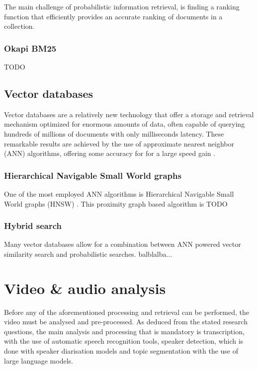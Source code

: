 \documentclass[twoside]{uva-inf-bachelor-thesis}
\begin{document}
 \cite{robertson1977probability}

The main challenge of probabilistic information retrieval, is finding a ranking function that efficiently provides an accurate ranking of documents in a collection. 

\subsubsection{Okapi BM25}
TODO


\subsection{Vector databases}
Vector databases are a relatively new technology that offer a storage and retrieval mechanism optimized for enormous amounts of data, often capable of querying hundreds of millions of documents with only milliseconds latency. 
These remarkable results are achieved by the use of approximate nearest neighbor (ANN) algorithms, offering some accuracy for for a large speed gain \cite{han2023comprehensive}. 

\subsubsection{Hierarchical Navigable Small World graphs}
One of the most employed ANN algorithms is Hierarchical Navigable Small World graphs (HNSW) \cite{malkov2018efficient}. This proximity graph based algorithm is TODO

\subsubsection{Hybrid search}
Many vector databases allow for a combination between ANN powered vector similarity search and probabilistic searches. balblalba...


\section{Video \& audio analysis}
Before any of the aforementioned processing and retrieval can be performed, the video must be analysed and pre-processed. As deduced from the stated research questions, the main analysis and processing that is mandatory is transcription, with the use of automatic speech recognition tools, speaker detection, which is done with speaker diarisation models and topic segmentation with the use of large language models.
\end{document}
